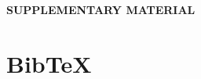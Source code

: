 \documentclass[12pt]{article}
\begin{document}
%
			
	

\newpage
\begin{center}
{\large\bf SUPPLEMENTARY MATERIAL}
\end{center}


\section{BibTeX}

 
 		
\end{document}
